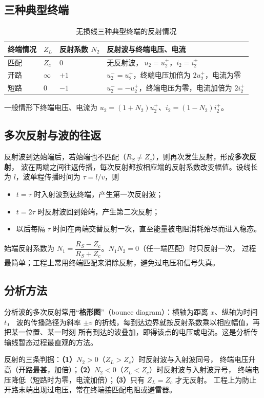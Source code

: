 \subsection{三种典型终端}
\begin{table}[htbp]
  \centering
  \renewcommand{\tablename}{表}%
  \caption{无损线三种典型终端的反射情况}
  \begin{tabular}{llll}
    \toprule
    终端情况 & $Z_L$ & 反射系数 $N_2$ & 反射波与终端电压、电流 \\
    \midrule
    匹配 & $Z_c$ & $0$ & 无反射波，$\ u_2=u_2^+$，$i_2=i_2^+$ \\
    开路 & $\infty$ & $+1$ & $u_2^-=u_2^+$，终端电压加倍为 $2u_2^+$，电流为零 \\
    短路 & $0$ & $-1$ & $u_2^-=-u_2^+$，终端电压为零，电流加倍为 $2i_2^+$ \\
    \bottomrule
  \end{tabular}
\end{table}
一般情形下终端电压、电流为 $u_2=(1+N_2)u_2^+$、$i_2=(1-N_2)i_2^+$。

\subsection{多次反射与波的往返}
反射波到达始端后，若始端也不匹配（$R_S\ne Z_c$），则再次发生反射，形成\textbf{多次反射}，
波在两端之间往返传播，每次反射都按相应端的反射系数改变幅值。设线长为 $l$，波单程传播时间为
$\tau=l/v$，则
\begin{itemize}
  \item $t=\tau$ 时入射波到达终端，产生第一次反射波；
  \item $t=2\tau$ 时反射波回到始端，产生第二次反射；
  \item 以后每隔 $\tau$ 时间在两端交替反射一次，直至能量被电阻消耗殆尽而进入稳态。
\end{itemize}
始端反射系数为 $N_1=\dfrac{R_S-Z_c}{R_S+Z_c}$。$N_1N_2=0$（任一端匹配）时只反射一次，
过程最简单；工程上常用终端匹配来消除反射，避免过电压和信号失真。

\subsection{分析方法}
分析波的多次反射常用“\textbf{格形图}”（bounce diagram）：横轴为距离 $x$、纵轴为时间 $t$，
波的传播路径为斜率 $\pm v$ 的折线，每到达边界就按反射系数乘以相应幅值，再把某一位置、某一时刻
所有到达的波叠加，即得该点的电压或电流。这是分析传输线暂态过程最直观的方法。

\begin{corepoint}{反射的三条判据：\textbf{（1）}$N_2>0$（$Z_L>Z_c$）时反射波与入射波同号，
终端电压升高（开路最甚，加倍）；\textbf{（2）}$N_2<0$（$Z_L<Z_c$）时反射波与入射波异号，
终端电压降低（短路时为零，电流加倍）；\textbf{（3）}只有 $Z_L=Z_c$ 才无反射。
工程上为防止开路末端出现过电压，常在终端接匹配电阻或避雷器。}
\end{corepoint}

